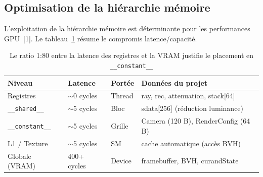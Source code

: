 \documentclass[12pt,a4paper]{article}
\begin{document}
\subsection{Optimisation de la hi\'{e}rarchie m\'{e}moire}

L'exploitation de la hi\'{e}rarchie m\'{e}moire est d\'{e}terminante pour les performances GPU~[1]. Le tableau~\ref{tab:mem_hierarchy} r\'{e}sume le compromis latence/capacit\'{e}.

\begin{table}[H]
\centering
\small
\caption{Le ratio 1:80 entre la latence des registres et la VRAM justifie le placement en \texttt{\_\_constant\_\_}}
\begin{tabular}{llll}
\toprule
\textbf{Niveau} & \textbf{Latence} & \textbf{Port\'{e}e} & \textbf{Donn\'{e}es du projet} \\
\midrule
Registres & $\sim$0 cycles & Thread & ray, rec, attenuation, stack[64] \\
\texttt{\_\_shared\_\_} & $\sim$5 cycles & Bloc & sdata[256] (r\'{e}duction luminance) \\
\texttt{\_\_constant\_\_} & $\sim$5 cycles & Grille & Camera (120 B), RenderConfig (64 B) \\
L1 / Texture & $\sim$5 cycles & SM & cache automatique (acc\`{e}s BVH) \\
Globale (VRAM) & 400+ cycles & Device & framebuffer, BVH, curandState \\
\bottomrule
\end{tabular}
\label{tab:mem_hierarchy}
\end{table}
\end{document}
